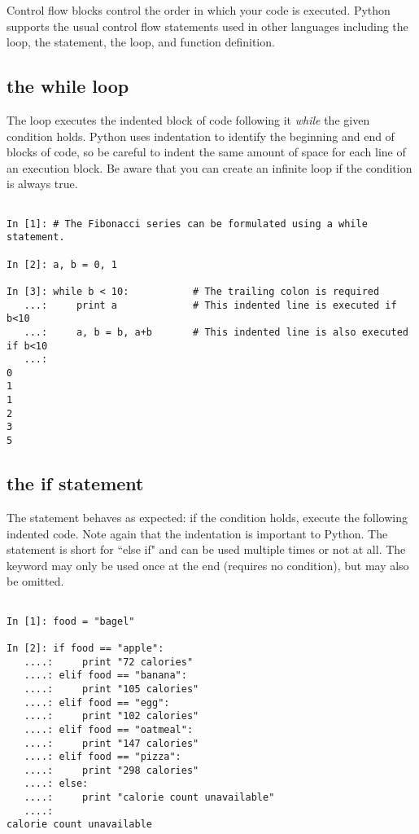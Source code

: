 Control flow blocks control the order in which your code is executed.
Python supports the usual control flow statements used in other languages
including the  loop, the  statement, the  loop, 
and function definition. 

\subsection*{the while loop}
\begin{example}

The  loop executes the indented block of code following it \emph{while} the given condition holds. Python uses indentation to identify the beginning and end of blocks of code, so be careful to indent the same amount of space for each line of an execution block.
Be aware that you can create an infinite loop if the condition is always true.

\begin{lstlisting}

In [1]: # The Fibonacci series can be formulated using a while statement. 

In [2]: a, b = 0, 1

In [3]: while b < 10:		    # The trailing colon is required
   ...:     print a             # This indented line is executed if b<10
   ...:     a, b = b, a+b       # This indented line is also executed if b<10
   ...:     
0
1
1
2
3
5

\end{lstlisting}
\end{example}

\subsection*{the if statement}
\begin{example}

The  statement behaves as expected: if the condition holds, execute the 
following indented code. Note again that the indentation is important to Python. 
The  statement is short for ``else if" and can be used multiple times or not at all. 
The  keyword may only be used once at the end (requires no condition), 
but may also be omitted. 

\begin{lstlisting}

In [1]: food = "bagel"

In [2]: if food == "apple":
   ....:     print "72 calories"
   ....: elif food == "banana":
   ....:     print "105 calories"
   ....: elif food == "egg":
   ....:     print "102 calories"
   ....: elif food == "oatmeal":
   ....:     print "147 calories"
   ....: elif food == "pizza":
   ....:     print "298 calories"
   ....: else: 
   ....:     print "calorie count unavailable"
   ....:     
calorie count unavailable
   
\end{lstlisting}
\end{example}

